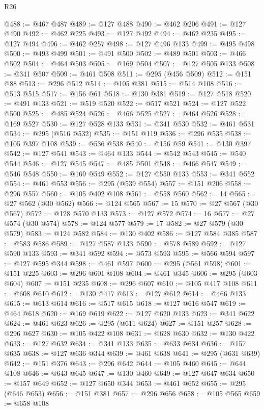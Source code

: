 \begin{lexlean}{R26}
\begin{coremodule}
@488 := @467 @487
@489 := @127 @488
@490 := @462 @206
@491 := @127 @490
@492 := @462 @225
@493 := @127 @492
@494 := @462 @235
@495 := @127 @494
@496 := @462 @257
@498 := @127 @496 @133
@499 := @495 @498
@500 := @493 @499
@501 := @491 @500
@502 := @489 @501
@503 := @466 @502
@504 := @464 @503
@505 := @169 @504
@507 := @127 @505 @133
@508 := @341 @507
@509 := @461 @508
@511 := @295 (@456 @509)
@512 := @151 @88
@513 := @296 @512
@514 := @105 @381
@515 := @514 @108
@516 := @513 @515
@517 := @156 @61
@518 := @130 @381
@519 := @127 @518
@520 := @491 @133
@521 := @519 @520
@522 := @517 @521
@524 := @127 @522 @500
@525 := @485 @524
@526 := @466 @525
@527 := @464 @526
@528 := @169 @527
@530 := @127 @528 @133
@531 := @341 @530
@532 := @461 @531
@534 := @295 (@516 @532)
@535 := @151 @119
@536 := @296 @535
@538 := @105 @397 @108
@539 := @536 @538
@540 := @156 @59
@541 := @130 @397
@542 := @127 @541
@543 := @464 @133
@544 := @542 @543
@545 := @540 @544
@546 := @127 @545
@547 := @485 @501
@548 := @466 @547
@549 := @546 @548
@550 := @169 @549
@552 := @127 @550 @133
@553 := @341 @552
@554 := @461 @553
@556 := @295 (@539 @554)
@557 := @151 @206
@558 := @296 @557
@560 := @105 @402 @108
@561 := @558 @560
@562 := 14
@565 := @27 @562 (@30 @562)
@566 := @124 @565
@567 := 15
@570 := @27 @567 (@30 @567)
@572 := @128 @570 @133
@573 := @127 @572
@574 := 16
@577 := @27 @574 (@30 @574)
@578 := @124 @577
@579 := 17
@582 := @27 @579 (@30 @579)
@583 := @124 @582
@584 := @130 @402
@586 := @127 @584 @385
@587 := @583 @586
@589 := @127 @587 @133
@590 := @578 @589
@592 := @127 @590 @133
@593 := @341 @592
@594 := @573 @593
@595 := @566 @594
@597 := @127 @595 @344
@598 := @461 @597
@600 := @295 (@561 @598)
@601 := @151 @225
@603 := @296 @601 @108
@604 := @461 @345
@606 := @295 (@603 @604)
@607 := @151 @235
@608 := @296 @607
@610 := @105 @417 @108
@611 := @608 @610
@612 := @130 @417
@613 := @127 @612
@614 := @466 @133
@615 := @613 @614
@616 := @517 @615
@618 := @127 @616 @547
@619 := @464 @618
@620 := @169 @619
@622 := @127 @620 @133
@623 := @341 @622
@624 := @461 @623
@626 := @295 (@611 @624)
@627 := @151 @257
@628 := @296 @627
@630 := @105 @422 @108
@631 := @628 @630
@632 := @130 @422
@633 := @127 @632
@634 := @341 @133
@635 := @633 @634
@636 := @157 @635
@638 := @127 @636 @344
@639 := @461 @638
@641 := @295 (@631 @639)
@642 := @151 @376
@643 := @296 @642
@644 := @105 @460
@645 := @644 @108
@646 := @643 @645
@647 := @130 @460
@649 := @127 @647 @634
@650 := @157 @649
@652 := @127 @650 @344
@653 := @461 @652
@655 := @295 (@646 @653)
@656 := @151 @381
@657 := @296 @656
@658 := @105 @565
@659 := @658 @108

\end{coremodule}
\end{lexlean}

